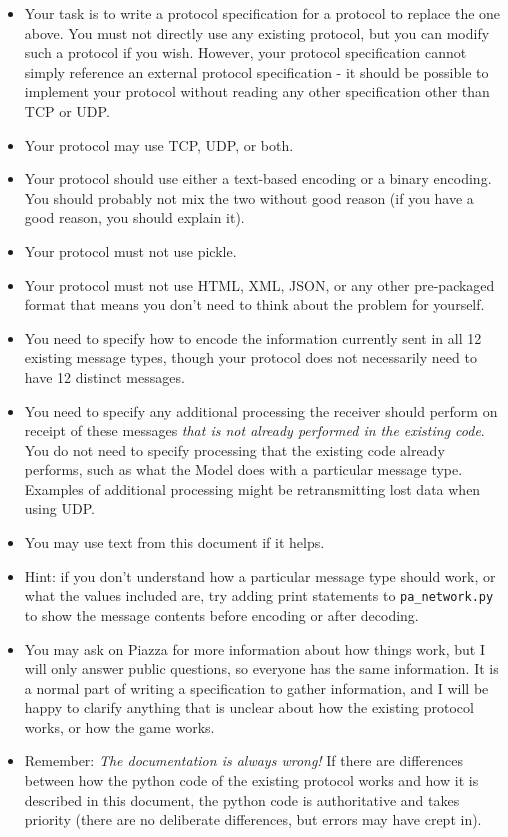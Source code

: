 \documentclass{article}
\begin{document}
\begin{itemize}
\item Your task is to write a protocol specification for a protocol to
replace the one above.  You must not directly use any existing
protocol, but you can modify such a protocol if you wish.  However,
your protocol specification cannot simply reference an external
protocol specification - it should be possible to implement your
protocol without reading any other specification other than TCP or UDP.

\item Your protocol may use TCP, UDP, or both.

\item Your protocol should use either a text-based encoding or a binary
encoding.  You should probably not mix the two without good reason (if you have
a good reason, you should explain it).

\item Your protocol must not use pickle.

\item Your protocol must not use HTML, XML, JSON, or any other
  pre-packaged format that means you don't need to think about the
  problem for yourself.

\item You need to specify how to encode the information currently sent
 in all 12 existing message types, though your protocol does not
 necessarily need to have 12 distinct messages.

\item You need to specify any additional processing the receiver
 should perform on receipt of these messages {\em that is not already
 performed in the existing code}.  You do not need to specify
 processing that the existing code already performs, such as what the
 Model does with a particular message type.  Examples of additional
 processing might be retransmitting lost data when using UDP.

\item You may use text from this document if it helps.

\item Hint: if you don't understand how a particular message type
  should work, or what the values included are, try adding print
  statements to {\tt pa\_network.py} to show the message contents
  before encoding or after decoding.

\item You may ask on Piazza for more information about how things
  work, but I will only answer public questions, so everyone has the
  same information.  It is a normal part of writing a specification to
  gather information, and I will be happy to clarify anything that is
  unclear about how the existing protocol works, or how the game
  works.

\item Remember: {\em The documentation is always wrong!} If there are
  differences between how the python code of the existing protocol
  works and how it is described in this document, the python code is
  authoritative and takes priority (there are no deliberate
  differences, but errors may have crept in).
\end{itemize}
\end{document}
